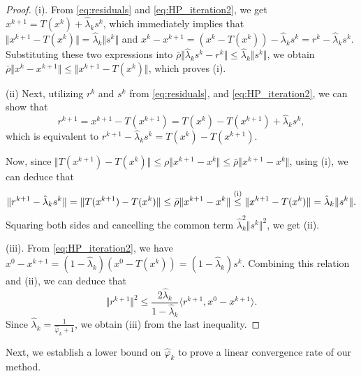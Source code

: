\documentclass{article}
\theoremstyle{plain}
\theoremstyle{definition}
\newcommand{\norms}[1]{\Vert#1\Vert}
\newcommand{\iprods}[1]{\langle #1\rangle}
\newcommand{\0}{\boldsymbol{0}}
\begin{document}
\begin{proof}
(i). From \eqref{eq:residuals} and \eqref{eq:HP_iteration2}, we get $x^{k+1} = T(x^k) + \hat{\lambda}_k s^k$, which immediately implies that $\norms{ x^{k+1} - T(x^k)} = \hat{\lambda}_k \norms{s^k}$ and $x^k - x^{k+1} = (x^k - T(x^k)) - \hat{\lambda}_k s^k = r^k - \hat{\lambda}_k s^k$.
Substituting these two expressions into $\bar{\rho} \norms{\hat{\lambda}_ks^k - r^k}  \leq \hat{\lambda}_k\norms{s^k}$, we obtain $\bar{\rho} \norms{ x^k - x^{k+1}} \leq \norms{ x^{k+1} - T(x^k)}$, which proves (i).
			
(ii) Next, utilizing $r^k$ and $s^k$ from \eqref{eq:residuals}, and \eqref{eq:HP_iteration2}, we can show that
\begin{equation*}
r^{k+1} = x^{k+1} - T(x^{k+1}) = T(x^k) - T(x^{k+1}) + \hat{\lambda}_k s^k,
\end{equation*}
which is equivalent to $r^{k+1} - \hat{\lambda}_k s^k = T(x^k) - T(x^{k+1})$.

Now, since $\norms{T(x^{k+1}) - T(x^k)} \leq \rho\norms{x^{k+1} - x^k} \leq \bar{\rho}\norms{x^{k+1} - x^k}$, using (i), we can deduce that
\begin{equation*}
\norms{ r^{k+1} - \hat{\lambda}_k s^k } = \norms{ T(x^{k+1}) - T(x^k)} \leq \bar{\rho} \norms{ x^{k+1} - x^k } \overset{\tiny\mathrm{(i)}}{\leq} \norms{ x^{k+1} - T(x^k) } =  \hat{\lambda}_k  \norms{ s^k }.
\end{equation*}
Squaring both sides and cancelling the common term $\hat{\lambda}_k^2\norms{s^k}^2$, we get (ii).
			
(iii). From \eqref{eq:HP_iteration2}, we have $x^0 - x^{k+1} = (1 - \hat{\lambda}_k) (x^0 - T(x^k)) = (1 - \hat{\lambda}_k)s^k$.
Combining this relation and  (ii), we can deduce that
\begin{equation*}
\norms{ r^{k+1} }^2 \leq \frac{2\hat{\lambda}_k}{1 - \hat{\lambda}_k} \iprods{ r^{k+1}, x^0 - x^{k+1}}.
\end{equation*}
Since $\hat{\lambda}_k = \frac{1}{\hat{\varphi}_k + 1}$, we obtain (iii) from the last inequality.
\end{proof}

Next, we establish a lower bound on $\hat{\varphi}_k$ to prove a linear convergence rate of our method.
\end{document}
